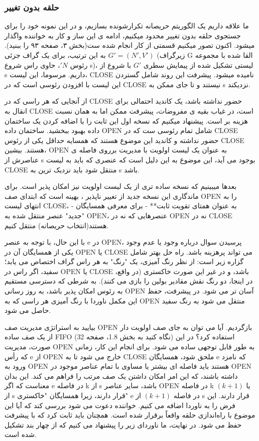 \documentclass{book} %
\begin{document}
\subsubsection*{حلقه بدون تغییر}

ما علاقه داریم یک الگوریتم حریصانه تکرارشونده بسازیم، و در این نمونه خود را برای جستجوی حلقه بدون تغییر محدود میکنیم، ادامه ی این ساز و کار به خواننده واگذار میشود. اکنون تصور میکنیم قسمتی از کار انجام شده ست(بخش ۳، صفحه ۹۳ را ببنید). به این ترتیب، برای یک گراف جزئی $G′ = (N′, V′)$ (زیرگراف G القا شده با مجموعه رئوس $'N$، حاوی راس شروع s)، لیستی تشکیل شده از پیمایش سطری $G'$ با شروع از s داریم.
مرسوما، این لیست، CLOSE نامیده میشود. پیشرفت این روند شامل گستردن این لیست با افزودن رئوسی است که در CLOSE نیستند و تا جای ممکن به s نزدیکند.


از آنجایی که هر راسی که در CLOSE حضور نداشته باشد، یک کاندید احتمالی برای انقال به CLOSE است، در غیاب بقیه ی مفروضات، پیشرفت ممکن اما به همان نسبت هزینه بر است.
پیشنهاد میکنیم که نسخه اول این ثابت را با اضافه کردن یک ساختمان داده بهبود ببخشید. ساختمان داده OPEN شامل تمام رئوسی ست که در CLOSE حضور نداشته و کاندید این موضوع هستند که همسایه حداقل یکی از رئوس CLOSE هستند.
بیشین، OPEN به عنوان یک لیست اولویت با مدیریت برروی فاصله ی عناصرش از ‌s بوجود می آید، این موضوع به این دلیل است که عنصری که باید به لیست CLOSE منتقل شود باید نزدیک ترین به s باشد.


بعدها میبینیم که نسخه ساده تری از یک لیست اولویت نیز امکان پذیر است. برای ماندگاری این نسخه جدید از تغییر ناپذیر ، بهینه است که ابتدای صف OPEN را به انتهای لیست CLOSE، - به عنوان همتای تقویت ثابت** - برای معرفی همسایگان "جدید" عنصر منتقل شده به OPEN، عنصرهایی که نه در OPEN نه در CLOSE هستند(انتخاب حریصانه) منتقل کنیم.

با این حال، با توجه به عنصر e در OPEN، پرسیدن سوال درباره وجود یا عدم وجود یکی از همسایگان آن در OPEN یا CLOSE می تواند پرهزینه باشد. راه حل بهتر شامل گزاره زیر است: از نظر رنگ آمیزی، یک "رنگ" به هر راس گراف اختصاص می یابد؛ سفید، اگر راس در OPEN یا CLOSE باشد، و در غیر این صورت خاکستری (در واقع، در اینجا، دو رنگ نقش مقادیر بولین را بازی می کنند). به شرطی که دسترسی مستقیم به رئوس امکان پذیر باشد، به روز رسانی OPEN آسان تر می شود. در پیشرفت، حفظ این مکمل ناوردا با رنگ آمیزی هر راسی که به OPEN منتقل می شود به رنگ سفید حاصل می شود.

بیایید به استراتژی مدیریت صف OPEN بازگردیم. آیا می توان به جای صف اولویت دار از یک صف ساده FIFO (نگاه کنید به بخش 1.8، صفحه 32) استفاده کرد؟ در این صورت، مدیریت OPEN به طور قابل توجهی ساده می شود. برای انجام این کار، زمانی که رأس e از OPEN خارج می شود تا به CLOSE ملحق شود، همسایگان e که نامزد ورود به OPEN هستند باید فاصله ای بیشتر یا مساوی با تمام عناصر موجود در OPEN داشته باشند، که این امر امکان داشتن یک صف مرتب را فراهم می کند. این بدان معناست که اگر e در فاصله k از s باشد، سایر عناصر OPEN در فاصله k یا $(k + 1)$ از s قرار دارند، زیرا همسایگان "خاکستری" e در فاصله $(k + 1)$ از s قرار دارند. این فرض را به ناوردا اضافه می کنیم. خواننده دعوت می شود بررسی کند که آیا این موضوع با راه‌اندازی حلقه واقعاً برقرار شده است. همچنان باید ثابت کرد که با پیشرفت حفظ می شود. در نهایت، ما ناوردای زیر را پیشنهاد می کنیم که از چهار بند تشکیل شده است.
\end{document}
